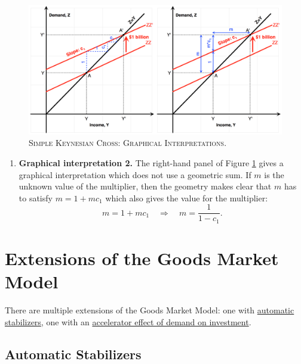 \documentclass[]{book}
\providecommand{\tightlist}{%
  \setlength{\itemsep}{0pt}\setlength{\parskip}{0pt}}
\theoremstyle{definition}
\theoremstyle{definition}
\theoremstyle{definition}
\theoremstyle{remark}
\begin{document}
\begin{figure}

{\centering \includegraphics[width=1\linewidth]{graphsketcher/keynesian-cross-merged} 

}

\caption{\textsc{Simple Keynesian Cross: Graphical
Interpretations}.}\label{fig:keynes-graphical}
\end{figure}

\begin{enumerate}
\def\labelenumi{\arabic{enumi}.}
\setcounter{enumi}{3}
\tightlist
\item
  \textbf{Graphical interpretation 2.} The right-hand panel of Figure
  \ref{fig:keynes-graphical} gives a graphical interpretation which does
  not use a geometric sum. If \(m\) is the unknown value of the
  multiplier, then the geometry makes clear that \(m\) has to satisfy
  \(m=1+mc_{1}\) which also gives the value for the multiplier:
  \[m=1+mc_{1} \quad\Rightarrow\quad m=\frac{1}{1-c_{1}}.\]
\end{enumerate}

\hypertarget{variations}{\section{Extensions of the Goods Market
Model}\label{variations}}

There are multiple extensions of the Goods Market Model: one with
\protect\hyperlink{automatic}{automatic stabilizers}, one with an
\protect\hyperlink{accelerator}{accelerator effect of demand on
investment}.

\hypertarget{automatic}{\subsection{Automatic
Stabilizers}\label{automatic}}
\end{document}
